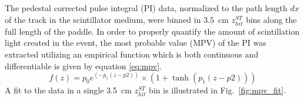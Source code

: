 	

The pedestal corrected pulse integral (PI) data, normalized to the path length $dx$ of the track in the scintillator medium, were binned in 3.5~cm $z^{ST}_{hit}$ bins along the full length of the paddle. In order to properly quantify the amount of scintillation light created in the event, the most probable value (MPV) of the PI was extracted utilizing an empirical function which is both continuous and differentiable is given by equation \ref{eq:mpv}.
	\begin{equation}\label{eq:mpv}
	f(z)  = p_0 e^{(-p_1(z - p2))} \times (1+ \tanh(p_1(z - p2))) 
	\end{equation}
A fit to the data in a single 3.5~cm $z^{ST}_{hit}$ bin is illustrated in Fig.~\ref{fig:mpv_fit}. 
